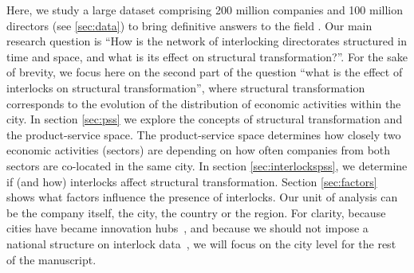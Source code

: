 Here, we study a large dataset comprising 200 million companies and 100 million directors (see \ref{sec:data}) to bring definitive answers to the field .
Our main research question is ``How is the network of interlocking directorates structured in time and space, and what is its effect on structural transformation?''.
For the sake of brevity, we focus here on the second part of the question ``what is the effect of interlocks on structural transformation'',
where structural transformation corresponds to the evolution of the distribution of economic activities within the city.
In section \ref{sec:pss} we explore the concepts of structural transformation and the product-service space.
The product-service space determines how closely two economic activities (sectors) are depending on how often companies from both sectors are co-located in the same city.
In section \ref{sec:interlockspss}, we determine if (and how) interlocks affect structural transformation.
Section \ref{sec:factors} shows what factors influence the presence of interlocks.
Our unit of analysis can be the company itself, the city, the country or the region. 
For clarity, 
because cities have became innovation hubs~\citep{Belderbos2014}, 
and because we should not impose a national structure on interlock data~\citep{Heemskerk2016},
we will focus on the city level for the rest of the manuscript.


